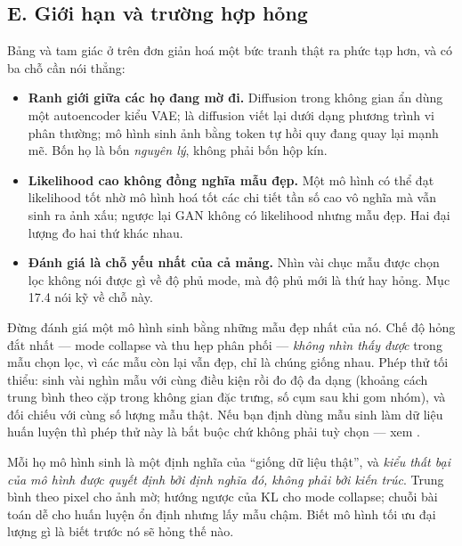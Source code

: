 \documentclass[../../../deep_learning.tex]{subfiles}
\begin{document}
\subsection{E. Giới hạn và trường hợp hỏng}
Bảng và tam giác ở trên đơn giản hoá một bức tranh thật ra phức tạp hơn, và có ba chỗ cần nói thẳng:
\begin{itemize}
\item \textbf{Ranh giới giữa các họ đang mờ đi.} Diffusion trong không gian ẩn dùng một autoencoder kiểu VAE;  là diffusion viết lại dưới dạng phương trình vi phân thường; mô hình sinh ảnh bằng token tự hồi quy đang quay lại mạnh mẽ. Bốn họ là bốn \emph{nguyên lý}, không phải bốn hộp kín.
\item \textbf{Likelihood cao không đồng nghĩa mẫu đẹp.} Một mô hình có thể đạt likelihood tốt nhờ mô hình hoá tốt các chi tiết tần số cao vô nghĩa mà vẫn sinh ra ảnh xấu; ngược lại GAN không có likelihood nhưng mẫu đẹp. Hai đại lượng đo hai thứ khác nhau.
\item \textbf{Đánh giá là chỗ yếu nhất của cả mảng.} Nhìn vài chục mẫu được chọn lọc không nói được gì về độ phủ mode, mà độ phủ mới là thứ hay hỏng. Mục 17.4 nói kỹ về chỗ này.
\end{itemize}

\begin{cambay}
Đừng đánh giá một mô hình sinh bằng những mẫu đẹp nhất của nó. Chế độ hỏng đắt nhất --- mode collapse và thu hẹp phân phối --- \emph{không nhìn thấy được} trong mẫu chọn lọc, vì các mẫu còn lại vẫn đẹp, chỉ là chúng giống nhau. Phép thử tối thiểu: sinh vài nghìn mẫu với cùng điều kiện rồi đo độ đa dạng (khoảng cách trung bình theo cặp trong không gian đặc trưng, số cụm sau khi gom nhóm), và đối chiếu với cùng số lượng mẫu thật. Nếu bạn định dùng mẫu sinh làm dữ liệu huấn luyện thì phép thử này là bắt buộc chứ không phải tuỳ chọn --- xem .
\end{cambay}

\begin{cannho}
Mỗi họ mô hình sinh là một định nghĩa của ``giống dữ liệu thật'', và \emph{kiểu thất bại của mô hình được quyết định bởi định nghĩa đó, không phải bởi kiến trúc}. Trung bình theo pixel cho ảnh mờ; hướng ngược của KL cho mode collapse; chuỗi bài toán dễ cho huấn luyện ổn định nhưng lấy mẫu chậm. Biết mô hình tối ưu đại lượng gì là biết trước nó sẽ hỏng thế nào. 
\end{cannho}
\end{document}

